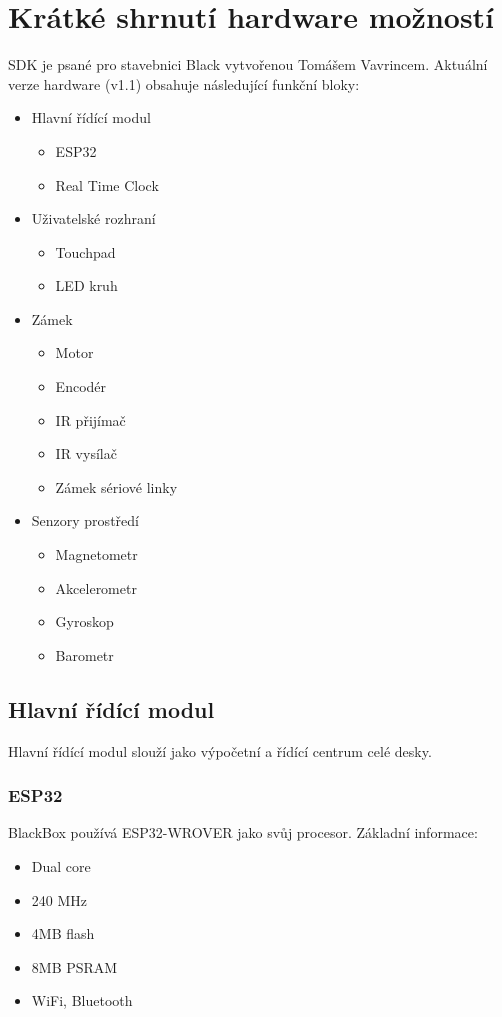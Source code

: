\newpage
\chapter{Krátké shrnutí hardware možností}
SDK je psané pro stavebnici Black vytvořenou Tomášem Vavrincem.
Aktuální verze hardware (v1.1) obsahuje následující funkční bloky:

\begin{itemize}[noitemsep]
    \item Hlavní řídící modul
        \begin{itemize}[noitemsep]
            \item ESP32
            \item Real Time Clock
        \end{itemize}
    \item Uživatelské rozhraní
        \begin{itemize}[noitemsep]
            \item Touchpad
            \item LED kruh
        \end{itemize}
    \item Zámek
        \begin{itemize}[noitemsep]
            \item Motor
            \item Encodér
            \item IR přijímač
            \item IR vysílač
            \item Zámek sériové linky
        \end{itemize}
    \item Senzory prostředí
        \begin{itemize}[noitemsep]
            \item Magnetometr
            \item Akcelerometr
            \item Gyroskop
            \item Barometr
        \end{itemize}
\end{itemize}

\newpage
\section{Hlavní řídící modul}
Hlavní řídící modul slouží jako výpočetní a řídící centrum celé desky.

\subsection{ESP32}
BlackBox používá ESP32-WROVER jako svůj procesor.
Základní informace:
\begin{itemize}
    \item Dual core
    \item 240 MHz
    \item 4MB flash
    \item 8MB PSRAM
    \item WiFi, Bluetooth
\end{itemize}

